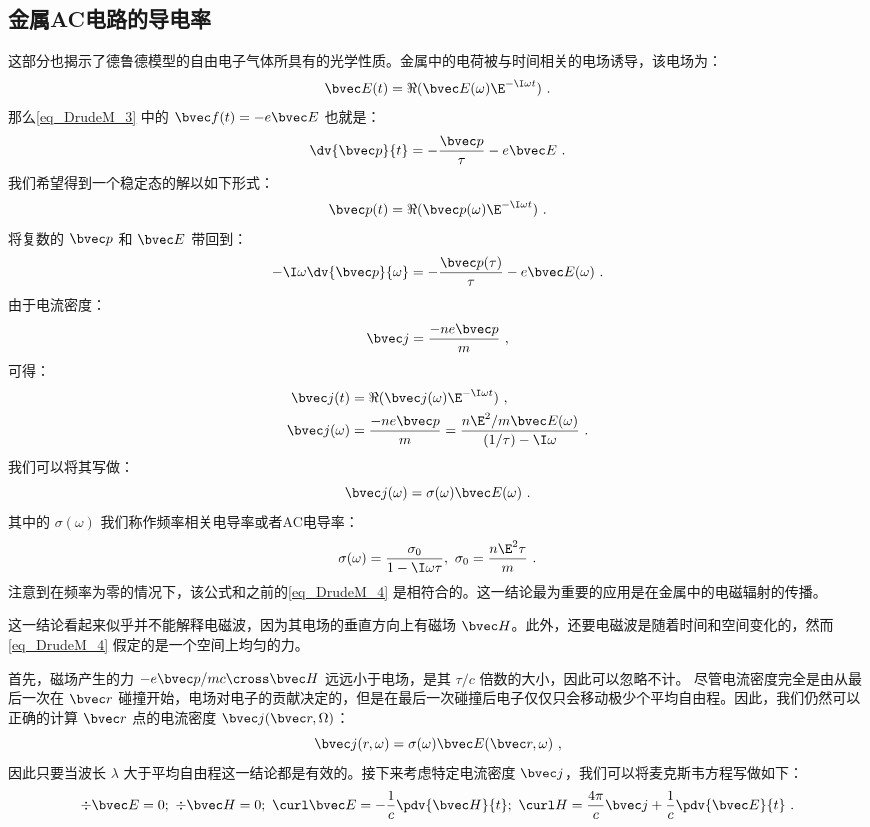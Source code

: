 \subsection{金属AC电路的导电率}
这部分也揭示了德鲁德模型的自由电子气体所具有的光学性质。金属中的电荷被与时间相关的电场诱导，该电场为：
\begin{equation}
\bvec E(t)=\Re(\bvec E(\omega)\E^{-\I\omega t})~.
\end{equation}
那么\autoref{eq_DrudeM_3} 中的 $\bvec f(t)=-e\bvec E$ 也就是：
\begin{equation}
\dv{\bvec p}{t}=-\frac{\bvec p}{\tau}-e\bvec E~.
\end{equation}
我们希望得到一个稳定态的解以如下形式：
\begin{equation}
\bvec p(t)=\Re(\bvec p(\omega)\E^{-\I\omega t})~.
\end{equation}
将复数的 $\bvec p$ 和 $\bvec E$ 带回到：
\begin{equation}
-\I\omega\dv{\bvec p}{\omega}=-\frac{\bvec p(\tau)}{\tau}-e\bvec E(\omega)~.
\end{equation}
由于电流密度：
\begin{equation}
\bvec j = \frac{-ne\bvec p}{m}~,
\end{equation}
可得：
\begin{align}
\bvec j(t)&=\Re(\bvec j(\omega)\E^{-\I\omega t})~,\\
\bvec j(\omega)&=\frac{-ne\bvec p}{m}=\frac{n\E^2/m\bvec E(\omega)}{(1/\tau)-\I\omega}~.
\end{align}
我们可以将其写做：
\begin{equation}
\bvec j(\omega)=\sigma(\omega)\bvec E(\omega)~.
\end{equation}
其中的 $\sigma(\omega)$ 我们称作频率相关电导率或者AC电导率：
\begin{equation}
\sigma(\omega)=\frac{\sigma_0}{1-\I\omega\tau},\ \sigma_0=\frac{n\E^2\tau}{m}~.
\end{equation}
注意到在频率为零的情况下，该公式和之前的\autoref{eq_DrudeM_4} 是相符合的。这一结论最为重要的应用是在金属中的电磁辐射的传播。

这一结论看起来似乎并不能解释电磁波，因为其电场的垂直方向上有磁场 $\bvec H$。此外，还要电磁波是随着时间和空间变化的，然而\autoref{eq_DrudeM_4} 假定的是一个空间上均匀的力。

首先，磁场产生的力 $-e\bvec p/mc\cross \bvec H$ 远远小于电场，是其 $\tau/c$ 倍数的大小，因此可以忽略不计。
尽管电流密度完全是由从最后一次在 $\bvec r$ 碰撞开始，电场对电子的贡献决定的，但是在最后一次碰撞后电子仅仅只会移动极少个平均自由程。因此，我们仍然可以正确的计算 $\bvec r$ 点的电流密度 $\bvec j(\bvec r,\Omega)$：
\begin{equation}
\bvec j(r,\omega)=\sigma(\omega)\bvec E(\bvec r,\omega)~,
\end{equation}
因此只要当波长 $\lambda$ 大于平均自由程这一结论都是有效的。接下来考虑特定电流密度 $\bvec j$，我们可以将麦克斯韦方程写做如下：
\begin{equation}
\div \bvec E =0;\ \div \bvec H = 0;\ \curl \bvec E =-\frac{1}{c}\pdv{ \bvec H}{t};\ \curl H = \frac{4\pi}{c}\bvec j+\frac{1}{c}\pdv{ \bvec E}{t}~.
\end{equation}

